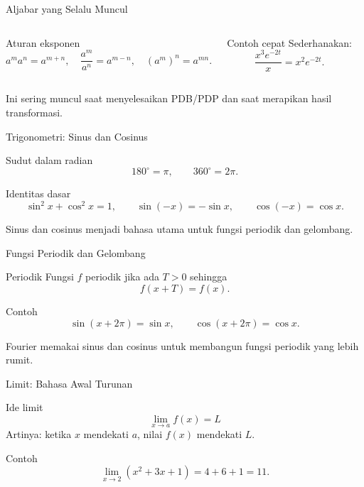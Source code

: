 \documentclass[aspectratio=169,11pt]{beamer}
\begin{document}
\begin{frame}{Aljabar yang Selalu Muncul}
\begin{columns}
\begin{block}{Aturan eksponen}
\[
a^m a^n=a^{m+n},\quad \frac{a^m}{a^n}=a^{m-n},\quad (a^m)^n=a^{mn}.
\]
\end{block}
\begin{block}{Contoh cepat}
Sederhanakan:
\[
\frac{x^3 e^{-2t}}{x}=x^2e^{-2t}.
\]
\end{block}
\end{columns}
\vspace{0.2cm}
Ini sering muncul saat menyelesaikan PDB/PDP dan saat merapikan hasil transformasi.
\end{frame}

\begin{frame}{Trigonometri: Sinus dan Cosinus}
\begin{block}{Sudut dalam radian}
\[
180^\circ=\pi,\qquad 360^\circ=2\pi.
\]
\end{block}
\begin{block}{Identitas dasar}
\[
\sin^2 x+\cos^2 x=1,
\qquad \sin(-x)=-\sin x,
\qquad \cos(-x)=\cos x.
\]
\end{block}
Sinus dan cosinus menjadi bahasa utama untuk fungsi periodik dan gelombang.
\end{frame}

\begin{frame}{Fungsi Periodik dan Gelombang}
\begin{block}{Periodik}
Fungsi $f$ periodik jika ada $T>0$ sehingga
\[
f(x+T)=f(x).
\]
\end{block}
\begin{exampleblock}{Contoh}
\[
\sin(x+2\pi)=\sin x,\qquad \cos(x+2\pi)=\cos x.
\]
\end{exampleblock}
Fourier memakai sinus dan cosinus untuk membangun fungsi periodik yang lebih rumit.
\end{frame}


\begin{frame}{Limit: Bahasa Awal Turunan}
\begin{block}{Ide limit}
\[
\lim_{x\to a} f(x)=L
\]
Artinya: ketika $x$ mendekati $a$, nilai $f(x)$ mendekati $L$.
\end{block}
\begin{exampleblock}{Contoh}
\[
\lim_{x\to 2}(x^2+3x+1)=4+6+1=11.
\]
\end{exampleblock}
\end{frame}
\end{document}
